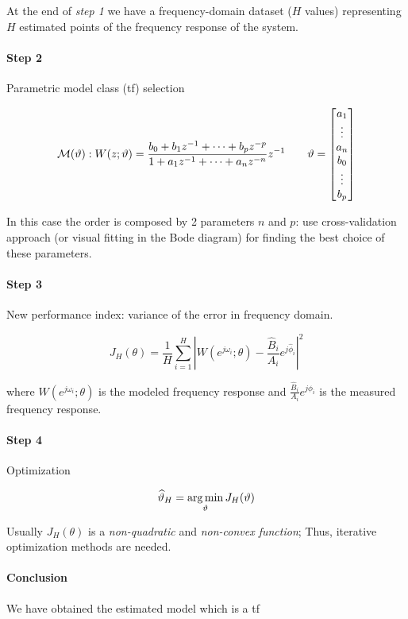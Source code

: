 At the end of \emph{step 1} we have a frequency-domain dataset ($H$ values) representing $H$ estimated points of the frequency response of the system.

\paragraph{Step 2} Parametric model class (\gls{tf}) selection

\[
    \mathcal{M}(\vartheta): W(z; \vartheta) = \frac{b_0+b_1z^{-1}+\cdots+b_pz^{-p}}{1+a_1z^{-1}+\cdots+a_nz^{-n}}z^{-1}
    \qquad
    \vartheta = \begin{bmatrix}
        a_1 \\ \vdots \\ a_n \\ b_0 \\ \vdots \\ b_p
    \end{bmatrix}
\]

\begin{remark}
    In this case the order is composed by 2 parameters $n$ and $p$:
    use cross-validation approach (or visual fitting in the Bode diagram) for finding the best choice of these parameters.
\end{remark}

\paragraph{Step 3} New performance index: variance of the error in frequency domain.

\[
    J_H(\theta) = \frac{1}{H} \sum_{i=1}^H \left | W(e^{j\omega_i}; \theta) - \frac{\hat{B}_i}{A_i}e^{j\hat{\phi}_i} \right | ^2
\]

where $W(e^{j\omega_i}; \theta)$ is the modeled frequency response and $\frac{\hat{B}_i}{A_i}e^{j\hat{\phi}_i}$ is the measured frequency response.

\paragraph{Step 4} Optimization

\[
    \widehat{\vartheta}_H = \operatorname*{arg\,min}_\vartheta J_H(\vartheta)
\]

Usually $J_H(\theta)$ is a \emph{non-quadratic} and \emph{non-convex function}; Thus, iterative optimization methods are needed.

\paragraph{Conclusion} We have obtained the estimated model which is a \gls{tf}

